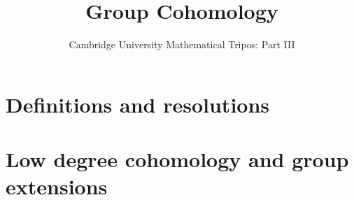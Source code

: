 \documentclass{article}
\title{Group Cohomology}
\author{Cambridge University Mathematical Tripos: Part III}
\begin{document}
\maketitle

\tableofcontentsnewpage{}

\section{Definitions and resolutions}

\section{Low degree cohomology and group extensions}


\end{document}
